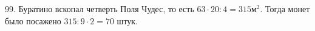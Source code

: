 99. Буратино вскопал четверть Поля Чудес, то есть $63\cdot20:4=315\text{м}^2.$ Тогда монет было посажено $315:9\cdot2=70$ штук.\\
